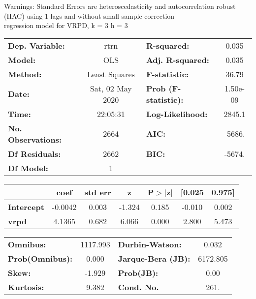 Warnings: \newline
 [1] Standard Errors are heteroscedasticity and autocorrelation robust (HAC) using 1 lags and without small sample correction\\ 

regression model for VRPD, k = 3 h = 3\begin{center}
\begin{tabular}{lclc}
\toprule
\textbf{Dep. Variable:}    &       rtrn       & \textbf{  R-squared:         } &     0.035   \\
\textbf{Model:}            &       OLS        & \textbf{  Adj. R-squared:    } &     0.035   \\
\textbf{Method:}           &  Least Squares   & \textbf{  F-statistic:       } &     36.79   \\
\textbf{Date:}             & Sat, 02 May 2020 & \textbf{  Prob (F-statistic):} &  1.50e-09   \\
\textbf{Time:}             &     22:05:31     & \textbf{  Log-Likelihood:    } &    2845.1   \\
\textbf{No. Observations:} &        2664      & \textbf{  AIC:               } &    -5686.   \\
\textbf{Df Residuals:}     &        2662      & \textbf{  BIC:               } &    -5674.   \\
\textbf{Df Model:}         &           1      & \textbf{                     } &             \\
\bottomrule
\end{tabular}
\begin{tabular}{lcccccc}
                   & \textbf{coef} & \textbf{std err} & \textbf{z} & \textbf{P$> |$z$|$} & \textbf{[0.025} & \textbf{0.975]}  \\
\midrule
\textbf{Intercept} &      -0.0042  &        0.003     &    -1.324  &         0.185        &       -0.010    &        0.002     \\
\textbf{vrpd}      &       4.1365  &        0.682     &     6.066  &         0.000        &        2.800    &        5.473     \\
\bottomrule
\end{tabular}
\begin{tabular}{lclc}
\textbf{Omnibus:}       & 1117.993 & \textbf{  Durbin-Watson:     } &    0.032  \\
\textbf{Prob(Omnibus):} &   0.000  & \textbf{  Jarque-Bera (JB):  } & 6172.805  \\
\textbf{Skew:}          &  -1.929  & \textbf{  Prob(JB):          } &     0.00  \\
\textbf{Kurtosis:}      &   9.382  & \textbf{  Cond. No.          } &     261.  \\
\bottomrule
\end{tabular}
\end{center}

